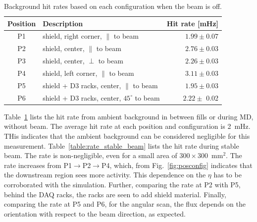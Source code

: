 \begin{table}
\begin{center}
\begin{tabular}{c|l|r}
  Position & \hspace{2cm}Description & Hit rate [mHz] \\
  \hline \hline
   P1 & shield, right corner, $\parallel$ to beam& $1.99\pm0.07$ \\ \hline
   P2 & shield, center, $\parallel$ to beam&  $2.76\pm 0.03$ \\ \hline
   P3 & shield, center, $\perp$ to beam& $ 2.26\pm 0.03$ \\ \hline
   P4 & shield, left corner, $\parallel$ to beam& $ 3.11\pm 0.03$ \\ \hline
   P5 & shield + D3 racks, center, $\parallel$ to beam& $ 1.95\pm 0.03$ \\ \hline
   P6 & shield + D3 racks, center, $45^\circ$ to beam& $ 2.22\pm $ 0.02\\ \hline
\end{tabular}
\caption{\label{table:rate_no_beam}
    Background hit rates based on each configuration when the beam is off.
}
\end{center}
\end{table}

Table~\ref{table:rate_no_beam} lists the hit rate from ambient background in between fills or during MD, without beam. The average hit rate at each position and configuration is 2~mHz.  THis indicates that the ambient background can be considered negligible for this measurement. Table~\ref{table:rate_stable_beam} lists the hit rate during stable beam. The rate is non-negligible, even for a small area of $300\times300$~mm$^2$. The rate increases from P1$\to$P2$\to$P4, which, from Fig.~\ref{fig:posconfig} indicates that the downstream region sees more activity. This dependence on the $\eta$ has to be corroborated with the simulation. Further, comparing the rate at P2 with P5, behind the DAQ racks, the racks are seen to add shield material. Finally, comparing the rate at P5 and P6, for the angular scan, the flux depends on the orientation with respect to the beam direction, as expected. 


